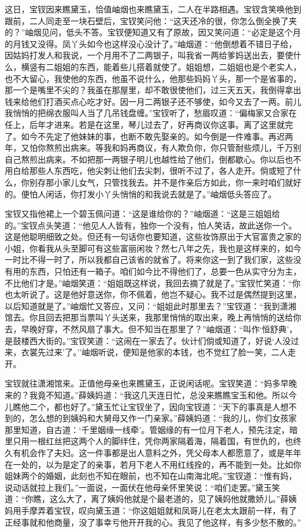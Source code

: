 这日，宝钗因来瞧黛玉，恰值岫烟也来瞧黛玉，二人在半路相遇。宝钗含笑唤他到跟前，二人同走至一块石壁后，宝钗笑问他：``这天还冷的很，你怎么倒全换了夹的？''岫烟见问，低头不答。宝钗便知道又有了原故，因又笑问道：``必定是这个月的月钱又没得。凤丫头如今也这样没心没计了。''岫烟道：``他倒想着不错日子给，因姑妈打发人和我说，一个月用不了二两银子，叫我省一两给爹妈送出去，要使什么，横竖有二姐姐的东西，能着些儿搭着就使了。姐姐想，二姐姐也是个老实人，也不大留心，我使他的东西，他虽不说什么，他那些妈妈丫头，那一个是省事的，那一个是嘴里不尖的？我虽在那屋里，却不敢很使他们，过三天五天，我倒得拿出钱来给他们打酒买点心吃才好。因一月二两银子还不够使，如今又去了一两。前儿我悄悄的把绵衣服叫人当了几吊钱盘缠。''宝钗听了，愁眉叹道：``偏梅家又合家在任上，后年才进来。若是在这里，琴儿过去了，好再商议你这事。离了这里就完了。如今不先定了他妹妹的事，也断不敢先娶亲的。如今倒是一件难事。再迟两年，又怕你熬煎出病来。等我和妈再商议，有人欺负你，你只管耐些烦儿，千万别自己熬煎出病来。不如把那一两银子明儿也越性给了他们，倒都歇心。你以后也不用白给那些人东西吃，他尖刺让他们去尖刺，很听不过了，各人走开。倘或短了什么，你别存那小家儿女气，只管找我去。并不是作亲后方如此，你一来时咱们就好的。便怕人闲话，你打发小丫头悄悄的和我说去就是了。''岫烟低头答应了。

宝钗又指他裙上一个碧玉佩问道：``这是谁给你的？''岫烟道：``这是三姐姐给的。''宝钗点头笑道：``他见人人皆有，独你一个没有，怕人笑话，故此送你一个。这是他聪明细致之处。但还有一句话你也要知道，这些妆饰原出于大官富贵之家的小姐，你看我从头至脚可有这些富丽闲妆？然七八年之先，我也是这样来的，如今一时比不得一时了，所以我都自己该省的就省了。将来你这一到了我们家，这些没有用的东西，只怕还有一箱子。咱们如今比不得他们了，总要一色从实守分为主，不比他们才是。''岫烟笑道：``姐姐既这样说，我回去摘了就是了。''宝钗忙笑道：``你也太听说了。这是他好意送你，你不佩着，他岂不疑心。我不过是偶然提到这里，以后知道就是了。''岫烟忙又答应，又问：``姐姐此时那里去？''宝钗道：``我到潇湘馆去。你且回去把那当票叫丫头送来，我那里悄悄的取出来，晚上再悄悄的送给你去，早晚好穿，不然风扇了事大。但不知当在那里了？''岫烟道：``叫作`恒舒典'，是鼓楼西大街的。''宝钗笑道：``这闹在一家去了。伙计们倘或知道了，好说`人没过来，衣裳先过来'了。''岫烟听说，便知是他家的本钱，也不觉红了脸一笑，二人走开。

宝钗就往潇湘馆来。正值他母亲也来瞧黛玉，正说闲话呢。宝钗笑道：``妈多早晚来的？我竟不知道。''薛姨妈道：``我这几天连日忙，总没来瞧瞧宝玉和他。所以今儿瞧他二个，都也好了。''黛玉忙让宝钗坐了，因向宝钗道：``天下的事真是人想不到的，怎么想的到姨妈和大舅母又作一门亲家。''薛姨妈道：``我的儿，你们女孩家那里知道，自古道：`千里姻缘一线牵'。管姻缘的有一位月下老人，预先注定，暗里只用一根红丝把这两个人的脚绊住，凭你两家隔着海，隔着国，有世仇的，也终久有机会作了夫妇。这一件事都是出人意料之外，凭父母本人都愿意了，或是年年在一处的，以为是定了的亲事，若月下老人不用红线拴的，再不能到一处。比如你姐妹两个的婚姻，此刻也不知在眼前，也不知在山南海北呢。''宝钗道：``惟有妈，说动话就拉上我们。''一面说，一面伏在他母亲怀里笑说：``咱们走罢。''黛玉笑道：``你瞧，这么大了，离了姨妈他就是个最老道的，见了姨妈他就撒娇儿。''薛姨妈用手摩弄着宝钗，叹向黛玉道：``你这姐姐就和凤哥儿在老太太跟前一样，有了正经事就和他商量，没了事幸亏他开开我的心。我见了他这样，有多少愁不散的。''

